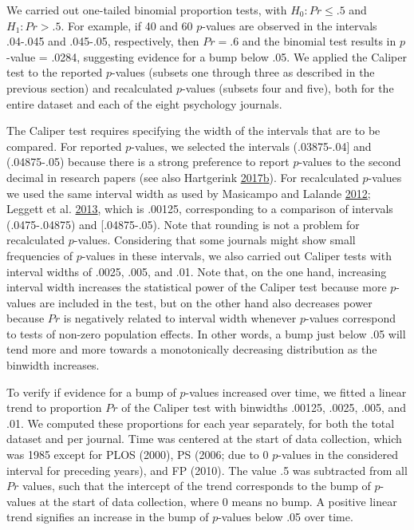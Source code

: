 \documentclass[a5paper]{book}
\begin{document}
We carried out one-tailed binomial proportion tests, with
\(H_{0}: Pr\leq.5\) and \(H_{1}: Pr>.5\). For example, if 40 and 60
\(p\)-values are observed in the intervals .04-.045 and .045-.05,
respectively, then \(Pr=.6\) and the binomial test results in
\(p\)-value = .0284, suggesting evidence for a bump below .05. We
applied the Caliper test to the reported \(p\)-values (subsets one
through three as described in the previous section) and recalculated
\(p\)-values (subsets four and five), both for the entire dataset and
each of the eight psychology journals.

The Caliper test requires specifying the width of the intervals that are
to be compared. For reported \(p\)-values, we selected the intervals
(.03875-.04{]} and (.04875-.05) because there is a strong preference to
report \(p\)-values to the second decimal in research papers (see also
Hartgerink
\protect\hyperlink{ref-doi:10.7717ux2fpeerj.3068}{2017}\protect\hyperlink{ref-doi:10.7717ux2fpeerj.3068}{b}).
For recalculated \(p\)-values we used the same interval width as used by
Masicampo and Lalande
\protect\hyperlink{ref-doi:10.1080ux2f17470218.2012.711335}{2012};
Leggett et al.
\protect\hyperlink{ref-doi:10.1080ux2f17470218.2013.863371}{2013}, which
is .00125, corresponding to a comparison of intervals (.0475-.04875) and
{[}.04875-.05). Note that rounding is not a problem for recalculated
\(p\)-values. Considering that some journals might show small
frequencies of \(p\)-values in these intervals, we also carried out
Caliper tests with interval widths of .0025, .005, and .01. Note that,
on the one hand, increasing interval width increases the statistical
power of the Caliper test because more \(p\)-values are included in the
test, but on the other hand also decreases power because \(Pr\) is
negatively related to interval width whenever \(p\)-values correspond to
tests of non-zero population effects. In other words, a bump just below
.05 will tend more and more towards a monotonically decreasing
distribution as the binwidth increases.

To verify if evidence for a bump of \(p\)-values increased over time, we
fitted a linear trend to proportion \(Pr\) of the Caliper test with
binwidths .00125, .0025, .005, and .01. We computed these proportions
for each year separately, for both the total dataset and per journal.
Time was centered at the start of data collection, which was 1985 except
for PLOS (2000), PS (2006; due to 0 \(p\)-values in the considered
interval for preceding years), and FP (2010). The value .5 was
subtracted from all \(Pr\) values, such that the intercept of the trend
corresponds to the bump of \(p\)-values at the start of data collection,
where 0 means no bump. A positive linear trend signifies an increase in
the bump of \(p\)-values below .05 over time.
\end{document}
